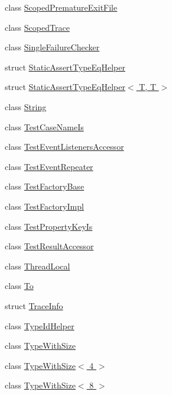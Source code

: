 \begin{DoxyCompactItemize}
class \hyperlink{classtesting_1_1internal_1_1_scoped_premature_exit_file}{Scoped\+Premature\+Exit\+File}
\item 
class \hyperlink{classtesting_1_1internal_1_1_scoped_trace}{Scoped\+Trace}
\item 
class \hyperlink{classtesting_1_1internal_1_1_single_failure_checker}{Single\+Failure\+Checker}
\item 
struct \hyperlink{structtesting_1_1internal_1_1_static_assert_type_eq_helper}{Static\+Assert\+Type\+Eq\+Helper}
\item 
struct \hyperlink{structtesting_1_1internal_1_1_static_assert_type_eq_helper_3_01_t_00_01_t_01_4}{Static\+Assert\+Type\+Eq\+Helper$<$ T, T $>$}
\item 
class \hyperlink{classtesting_1_1internal_1_1_string}{String}
\item 
class \hyperlink{classtesting_1_1internal_1_1_test_case_name_is}{Test\+Case\+Name\+Is}
\item 
class \hyperlink{classtesting_1_1internal_1_1_test_event_listeners_accessor}{Test\+Event\+Listeners\+Accessor}
\item 
class \hyperlink{classtesting_1_1internal_1_1_test_event_repeater}{Test\+Event\+Repeater}
\item 
class \hyperlink{classtesting_1_1internal_1_1_test_factory_base}{Test\+Factory\+Base}
\item 
class \hyperlink{classtesting_1_1internal_1_1_test_factory_impl}{Test\+Factory\+Impl}
\item 
class \hyperlink{classtesting_1_1internal_1_1_test_property_key_is}{Test\+Property\+Key\+Is}
\item 
class \hyperlink{classtesting_1_1internal_1_1_test_result_accessor}{Test\+Result\+Accessor}
\item 
class \hyperlink{classtesting_1_1internal_1_1_thread_local}{Thread\+Local}
\item 
class \hyperlink{classtesting_1_1internal_1_1_to}{To}
\item 
struct \hyperlink{structtesting_1_1internal_1_1_trace_info}{Trace\+Info}
\item 
class \hyperlink{classtesting_1_1internal_1_1_type_id_helper}{Type\+Id\+Helper}
\item 
class \hyperlink{classtesting_1_1internal_1_1_type_with_size}{Type\+With\+Size}
\item 
class \hyperlink{classtesting_1_1internal_1_1_type_with_size_3_014_01_4}{Type\+With\+Size$<$ 4 $>$}
\item 
class \hyperlink{classtesting_1_1internal_1_1_type_with_size_3_018_01_4}{Type\+With\+Size$<$ 8 $>$}

\end{DoxyCompactItemize}
